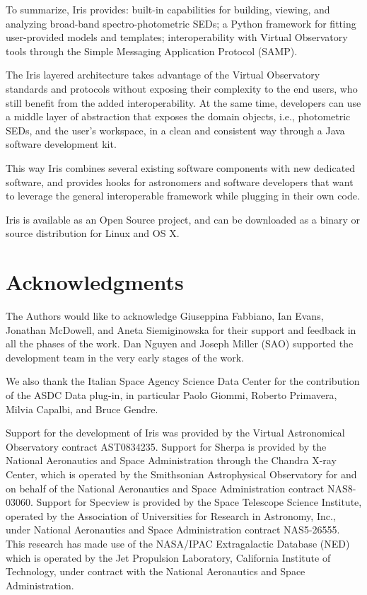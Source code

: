 \documentclass[preprint,authoryear,5p]{elsarticle}
\begin{document}
To summarize, Iris provides: built-in capabilities for building, viewing, and
analyzing broad-band spec\-tro-pho\-to\-met\-ric SEDs; a Python framework for fitting
user-pro\-vid\-ed models and templates; interoperability with Virtual Observatory
tools through the Simple Messaging Application Protocol (SAMP).

The Iris layered architecture takes advantage of the Virtual Observatory
standards and protocols without exposing their complexity to the end users,
who still benefit from the added interoperability. At the same time, developers
can use a middle layer of abstraction that exposes the domain objects, i.e.,
photometric SEDs, and the user's workspace, in a clean and consistent
way through a Java software development kit.

\begin{sloppypar}
This way Iris combines several existing software components with new dedicated
software, and provides hooks for astronomers and software developers that want to
leverage the general interoperable framework while plugging in their own code.
\end{sloppypar}

Iris is available as an Open Source project, and can be downloaded as a binary
or source distribution for Linux and OS X.


\section*{Acknowledgments}
\begin{sloppypar}
The Authors would like to acknowledge Giuseppina Fabbiano, Ian Evans,
Jonathan McDowell, and Aneta Siemiginowska
for their support and feedback in all the phases of the work.
Dan Nguyen and Joseph Miller (SAO) supported the
development team in the very early stages of the work.
\end{sloppypar}

We also thank the Italian Space Agency Science Data Center for the contribution
of the ASDC Data plug-in, in particular Paolo Giommi, Roberto Primavera,
Milvia Capalbi, and Bruce Gendre.

Support for the development of Iris was provided by
the Virtual Astronomical Observatory contract AST0834235. Support for Sherpa is
provided by the National Aeronautics and Space Administration through the
Chandra X-ray Center, which is operated by the Smithsonian Astrophysical
Observatory for and on behalf of the National Aeronautics and Space
Administration contract NAS8-03060.  Support for Specview is provided by the
Space Telescope Science Institute, operated by the Association of Universities
for Research in Astronomy, Inc., under National Aeronautics and Space
Administration contract NAS5-26555. This research has made use of the NASA/IPAC
Extragalactic Database (NED) which is operated by the Jet Propulsion Laboratory,
California Institute of Technology, under contract with the National Aeronautics
and Space Administration.
\end{document}
